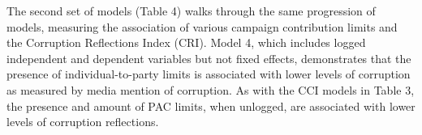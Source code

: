 \documentclass{jopsubmission}
\begin{document}
The second set of models (Table 4) walks through the same progression of
models, measuring the association of various campaign contribution
limits and the Corruption Reflections Index (CRI). Model 4, which
includes logged independent and dependent variables but not fixed
effects, demonstrates that the presence of individual-to-party limits is
associated with lower levels of corruption as measured by media mention
of corruption. As with the CCI models in Table 3, the presence and
amount of PAC limits, when unlogged, are associated with lower levels of
corruption reflections.

\begin{table}[!htbp] \centering 
  \caption{Models of Contribution Limits and Corruption Convictions} 
  \label{} 
\small 
{}
\end{table}
\end{document}
